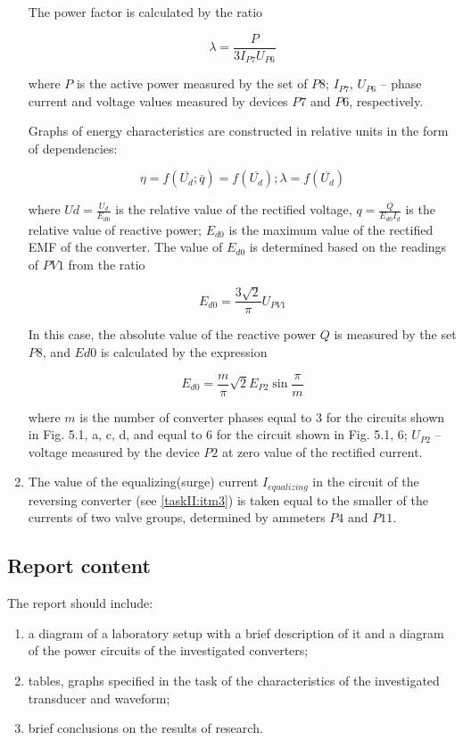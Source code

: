 \documentclass[a4paper,14pt]{article}
\begin{document}
\begin{enumerate}[label=\emph{\arabic*}. , ref=\emph{\thesubsection.\arabic*}, leftmargin=0pt, labelindent=\parindent]
\begin{itemize}
\end{itemize}


The power factor is calculated by the ratio

$$
\lambda = \frac{P}{3I_{P7}U_{P6}}
$$

where $P$ is the active power measured by the set of $P8$; $I_{P7}$, $U_{P6}$ -- phase current and 
voltage values measured by devices $P7$ and $P6$, respectively.

Graphs of energy characteristics are constructed in relative units in the form of dependencies:

$$
                \eta = f(\overline{U_d}; \overline{q}) = f(\overline{U_d}); \lambda = f(\overline{U_d})
$$

where ${\displaystyle Ud = \frac{U_d}{E_{d0}}}$ is the relative value of the rectified voltage,
${\displaystyle q = \frac{Q}{E_{d0}I_d}}$ is the relative value of reactive power; $E_{d0}$
is the maximum value of the rectified EMF of the converter.
The value of $E_{d0}$ is determined based on the readings of $PV1$ from the ratio

$$
E_{d0} = \frac{3\sqrt{2}}{\pi} U_{PV1}
$$


In this case, the absolute value of the reactive power $Q$ is measured by the set $P8$, 
and $Ed0$ is calculated by the expression

$$
E_{d0} = \frac{m}{\pi} \sqrt{2} E_{P2} \sin\frac{\pi}{m}
$$

where $m$ is the number of converter phases equal to 3 for the circuits shown in Fig. 5.1, a, c, d, 
and equal to 6 for the circuit shown in Fig. 5.1, 6; $U_{P2}$ -- voltage measured by the device $P2$ 
at zero value of the rectified current.

\item The value of the equalizing(surge) current $I_{equalizing}$ in the circuit of the reversing converter 
(see \ref{taskII:itm3}) is taken equal to the smaller of the currents of two valve groups, 
determined by ammeters $P4$ and $P11$.

\end{enumerate}

\subsection{Report content}

The report should include:

\begin{enumerate}
\item a diagram of a laboratory setup with a brief description of it and a diagram of the power circuits of the investigated converters;

\item tables, graphs specified in the task of the characteristics of the investigated transducer and waveform;

\item brief conclusions on the results of research.
\end{enumerate}
\end{document}
